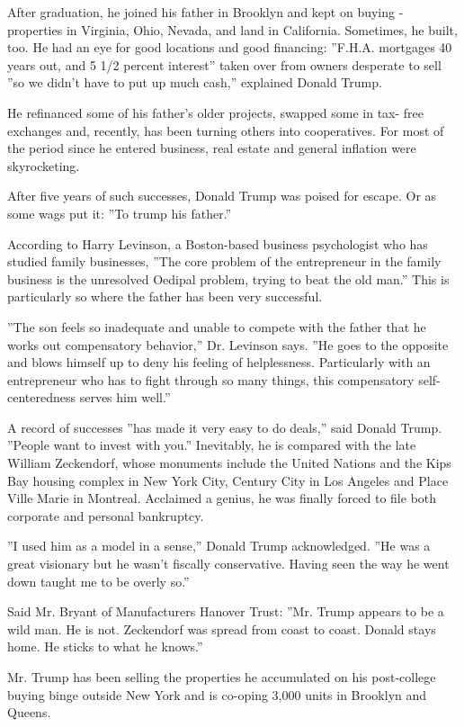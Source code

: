 After graduation, he joined his father in Brooklyn and kept on buying -
properties in Virginia, Ohio, Nevada, and land in California. Sometimes,
he built, too. He had an eye for good locations and good financing:
''F.H.A. mortgages 40 years out, and 5 1/2 percent interest'' taken over
from owners desperate to sell ''so we didn't have to put up much cash,''
explained Donald Trump.

He refinanced some of his father's older projects, swapped some in tax-
free exchanges and, recently, has been turning others into cooperatives.
For most of the period since he entered business, real estate and
general inflation were skyrocketing.

After five years of such successes, Donald Trump was poised for escape.
Or as some wags put it: ''To trump his father.''

According to Harry Levinson, a Boston-based business psychologist who
has studied family businesses, ''The core problem of the entrepreneur in
the family business is the unresolved Oedipal problem, trying to beat
the old man.'' This is particularly so where the father has been very
successful.

''The son feels so inadequate and unable to compete with the father that
he works out compensatory behavior,'' Dr. Levinson says. ''He goes to
the opposite and blows himself up to deny his feeling of helplessness.
Particularly with an entrepreneur who has to fight through so many
things, this compensatory self-centeredness serves him well.''

A record of successes ''has made it very easy to do deals,'' said Donald
Trump. ''People want to invest with you.'' Inevitably, he is compared
with the late William Zeckendorf, whose monuments include the United
Nations and the Kips Bay housing complex in New York City, Century City
in Los Angeles and Place Ville Marie in Montreal. Acclaimed a genius, he
was finally forced to file both corporate and personal bankruptcy.

''I used him as a model in a sense,'' Donald Trump acknowledged. ''He
was a great visionary but he wasn't fiscally conservative. Having seen
the way he went down taught me to be overly so.''

Said Mr. Bryant of Manufacturers Hanover Trust: ''Mr. Trump appears to
be a wild man. He is not. Zeckendorf was spread from coast to coast.
Donald stays home. He sticks to what he knows.''

Mr. Trump has been selling the properties he accumulated on his
post-college buying binge outside New York and is co-oping 3,000 units
in Brooklyn and Queens.

